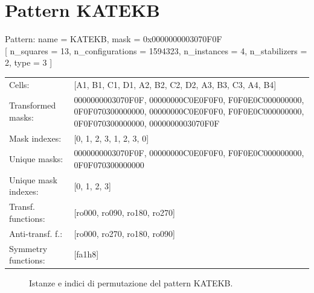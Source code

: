 \newpage

\section{Pattern KATEKB}

\begin{tcolorbox}[sharp corners, fontupper=\ttfamily\small, colback=white]
  \noindent Pattern: name = KATEKB, mask = 0x0000000003070F0F\\
  {[} n\_squares = 13, n\_configurations = 1594323,
  n\_instances = 4, n\_stabilizers = 2, type = 3 { ]}\\[1.0ex]
  \begin{tabularx}{\textwidth}{@{} p{3.5cm} X @{}}
    Cells:               & {[}A1, B1, C1, D1, A2, B2, C2, D2, A3, B3, C3, A4, B4{]}\\[0.5ex]
    Transformed masks:   & 0000000003070F0F, 00000000C0E0F0F0, F0F0E0C000000000, 0F0F070300000000, 00000000C0E0F0F0, F0F0E0C000000000, 0F0F070300000000, 0000000003070F0F\\[0.5ex]
    Mask indexes:        & {[}0, 1, 2, 3, 1, 2, 3, 0{]}\\[0.5ex]
    Unique masks:        & 0000000003070F0F, 00000000C0E0F0F0, F0F0E0C000000000, 0F0F070300000000\\[0.5ex]
    Unique mask indexes: & {[}0, 1, 2, 3{]}\\[0.5ex]
    Transf. functions:   & {[}ro000, ro090, ro180, ro270{]}\\[0.5ex]
    Anti-transf. f.:     & {[}ro000, ro270, ro180, ro090{]}\\[0.5ex]
    Symmetry functions:  & {[}fa1h8{]}\\[0.5ex]
  \end{tabularx}
\end{tcolorbox}

\begin{figure}[htbp]
  \centering
   \hfill
   \hfill
   \hfill
  \vspace{0.3cm}
   \hfill
   \hfill
   \hfill
  \caption{Istanze e indici di permutazione del pattern KATEKB.}
\end{figure}

